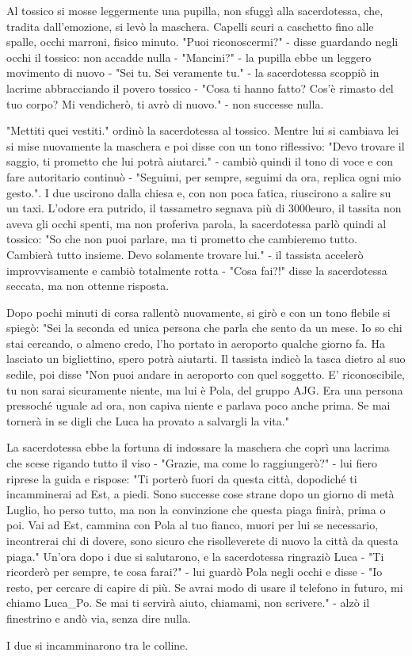 Al tossico si mosse leggermente una pupilla, non sfuggì alla sacerdotessa, che, tradita dall'emozione, si levò la maschera. Capelli scuri a caschetto fino alle spalle, occhi marroni, fisico minuto.
"Puoi riconoscermi?" - disse guardando negli occhi il tossico: non accadde nulla - "Mancini?" - la pupilla ebbe un leggero movimento di nuovo - "Sei tu. Sei veramente tu." - la sacerdotessa scoppiò in lacrime abbracciando il povero tossico - "Cosa ti hanno fatto? Cos'è rimasto del tuo corpo? Mi vendicherò, ti avrò di nuovo." - non successe nulla.

"Mettiti quei vestiti." ordinò la sacerdotessa al tossico. Mentre lui si cambiava lei si mise nuovamente la maschera e poi disse con un tono riflessivo: "Devo trovare il saggio, ti prometto che lui potrà aiutarci." - cambiò quindi il tono di voce e con fare autoritario continuò - "Seguimi, per sempre, seguimi da ora, replica ogni mio gesto.".
I due uscirono dalla chiesa e, con non poca fatica, riuscirono a salire su un taxi. L'odore era putrido, il tassametro segnava più di 3000euro, il tassita non aveva gli occhi spenti, ma non proferiva parola, la sacerdotessa parlò quindi al tossico: "So che non puoi parlare, ma ti prometto che cambieremo tutto. Cambierà tutto insieme. Devo solamente trovare lui." - il tassista accelerò improvvisamente e cambiò totalmente rotta - "Cosa fai?!" disse la sacerdotessa seccata, ma non ottenne risposta.

Dopo pochi minuti di corsa rallentò nuovamente, si girò e con un tono flebile si spiegò: "Sei la seconda ed unica persona che parla che sento da un mese. Io so chi stai cercando, o almeno credo, l'ho portato in aeroporto qualche giorno fa. Ha lasciato un bigliettino, spero potrà aiutarti. Il tassista indicò la tasca dietro al suo sedile, poi disse "Non puoi andare in aeroporto con quel soggetto. E' riconoscibile, tu non sarai sicuramente niente, ma lui è Pola, del gruppo AJG. Era una persona pressoché uguale ad ora, non capiva niente e parlava poco anche prima. Se mai tornerà in se digli che Luca ha provato a salvargli la vita."

La sacerdotessa ebbe la fortuna di indossare la maschera che coprì una lacrima che scese rigando tutto il viso - "Grazie, ma come lo raggiungerò?" - lui fiero riprese la guida e rispose: "Ti porterò fuori da questa città, dopodiché ti incamminerai ad Est, a piedi. Sono successe cose strane dopo un giorno di metà Luglio, ho perso tutto, ma non la convinzione che questa piaga finirà, prima o poi. Vai ad Est, cammina con Pola al tuo fianco, muori per lui se necessario, incontrerai chi di dovere, sono sicuro che risolleverete di nuovo la città da questa piaga."
Un'ora dopo i due si salutarono, e la sacerdotessa ringraziò Luca - "Ti ricorderò per sempre, te cosa farai?" - lui guardò Pola negli occhi e disse - "Io resto, per cercare di capire di più. Se avrai modo di usare il telefono in futuro, mi chiamo Luca\_Po. Se mai ti servirà aiuto, chiamami, non scrivere." - alzò il finestrino e andò via, senza dire nulla.

I due si incamminarono tra le colline.
